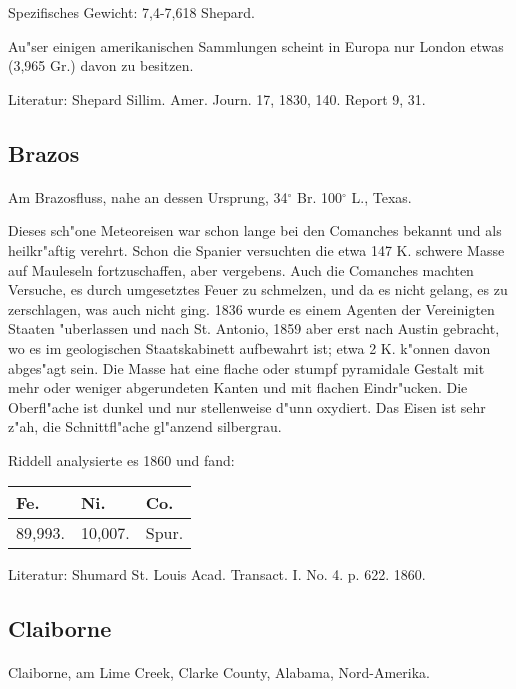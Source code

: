 \documentclass[a4paper, 11pt, oneside]{article}
\begin{document}
Spezifisches Gewicht: 7,4-7,618 Shepard.

Au"ser einigen amerikanischen Sammlungen scheint in Europa nur London etwas (3,965 Gr.) davon zu besitzen.

\footnotesize
Literatur: Shepard Sillim. Amer. Journ. 17, 1830, 140. Report 9, 31.

\subsection{Brazos}
\normalsize
\paragraph{}
Am Brazosfluss, nahe an dessen Ursprung, 34$^\circ$ Br. 100$^\circ$ L., Texas.

Dieses sch"one Meteoreisen war schon lange bei den Comanches bekannt und als heilkr"aftig verehrt. Schon die Spanier versuchten die etwa 147 K. schwere Masse auf Mauleseln fortzuschaffen, aber vergebens. Auch die Comanches machten Versuche, es durch umgesetztes Feuer zu schmelzen, und da es nicht gelang, es zu zerschlagen, was auch nicht ging. 1836 wurde es einem Agenten der Vereinigten Staaten "uberlassen und nach St. Antonio, 1859 aber erst nach Austin gebracht, wo es im geologischen Staatskabinett aufbewahrt ist; etwa 2 K. k"onnen davon abges"agt sein. Die Masse hat eine flache oder stumpf pyramidale Gestalt mit mehr oder weniger abgerundeten Kanten und mit flachen Eindr"ucken. Die Oberfl"ache ist dunkel und nur stellenweise d"unn oxydiert. Das Eisen ist sehr z"ah, die Schnittfl"ache gl"anzend silbergrau.

Riddell analysierte es 1860 und fand:
\begin{table}[H]
    \centering
    \begin{tabular}{l l l}
        Fe. & Ni. & Co. \\ \hline
        89,993. & 10,007. & Spur. \\
    \end{tabular}
\end{table}

\footnotesize
Literatur: Shumard St. Louis Acad. Transact. I. No. 4. p. 622. 1860.

\subsection{Claiborne}
\normalsize
\paragraph{}
Claiborne, am Lime Creek, Clarke County, Alabama, Nord-Amerika.
\end{document}
